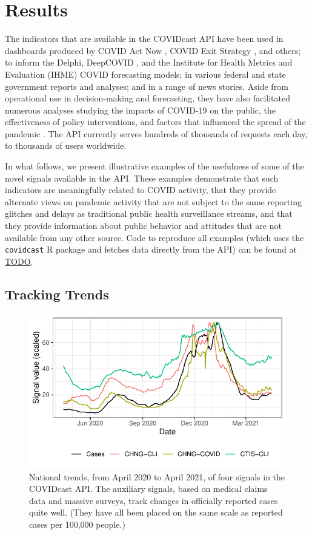 \documentclass[9pt,twocolumn,twoside,lineno]{pnas-new}
\begin{document}
\section{Results}

The indicators that are available in the COVIDcast API have been used in
dashboards produced by COVID Act Now \cite{CovidActNow}, COVID Exit Strategy
\cite{CovidExitStrategy}, and others; to inform the Delphi, DeepCOVID
\cite{Rodriguez:2021}, and the Institute for Health Metrics and Evaluation
(IHME) \cite{IHMEProj} COVID forecasting models; in various federal and state
government reports and analyses; and in a range of news stories. Aside from
operational use in decision-making and forecasting, they have also facilitated
numerous analyses studying the impacts of COVID-19 on the public, the
effectiveness of policy interventions, and factors that influenced the spread of
the pandemic \cite{Adjodah:2021, Pierri:2021, Jewell:2021, Chakrabarti:2020,
  Doerr:2021}. The API currently serves hundreds of thousands of requests each
day, to thousands of users worldwide.

In what follows, we present illustrative examples of the usefulness of some of
the novel signals available in the API. These examples demonstrate that such
indicators are meaningfully related to COVID activity, that they provide
alternate views on pandemic activity that are not subject to the same reporting
glitches and delays as traditional public health surveillance streams, and that
they provide information about public behavior and attitudes that are not
available from any other source. Code to reproduce all examples (which uses the
\texttt{covidcast} R package and fetches data directly from the API) can be
found at \url{TODO}.

\subsection{Tracking Trends}

\begin{figure}
  \centering
  \includegraphics[width=\columnwidth]{fig/time_trends_national.pdf}
  \caption{National trends, from April 2020 to April 2021, of four signals in
    the COVIDcast API. The auxiliary signals, based on medical claims data and
    massive surveys, track changes in officially reported cases quite
    well. (They have all been placed on the same scale as reported cases per
    100,000 people.)}
  \label{fig:time_trends_national}
\end{figure}
\end{document}
